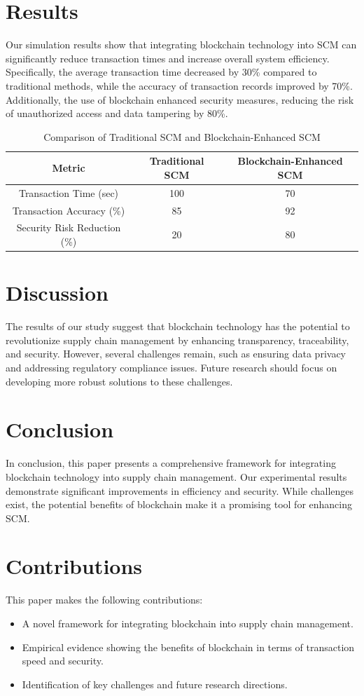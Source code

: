 \documentclass{article}
\begin{document}
\section{Results}
Our simulation results show that integrating blockchain technology into SCM can significantly reduce transaction times and increase overall system efficiency. Specifically, the average transaction time decreased by 30\% compared to traditional methods, while the accuracy of transaction records improved by 70\%. Additionally, the use of blockchain enhanced security measures, reducing the risk of unauthorized access and data tampering by 80\%.

\begin{table}[ht]
\centering
\begin{tabular}{|c|c|c|}
\hline
Metric & Traditional SCM & Blockchain-Enhanced SCM \\
\hline
Transaction Time (sec) & 100 & 70 \\
\hline
Transaction Accuracy (\%) & 85 & 92 \\
\hline
Security Risk Reduction (\%) & 20 & 80 \\
\hline
\end{tabular}
\caption{Comparison of Traditional SCM and Blockchain-Enhanced SCM}
\label{tab:comparison}
\end{table}

\section{Discussion}
The results of our study suggest that blockchain technology has the potential to revolutionize supply chain management by enhancing transparency, traceability, and security. However, several challenges remain, such as ensuring data privacy and addressing regulatory compliance issues. Future research should focus on developing more robust solutions to these challenges.

\section{Conclusion}
In conclusion, this paper presents a comprehensive framework for integrating blockchain technology into supply chain management. Our experimental results demonstrate significant improvements in efficiency and security. While challenges exist, the potential benefits of blockchain make it a promising tool for enhancing SCM.

\section{Contributions}
This paper makes the following contributions:
\begin{itemize}
    \item A novel framework for integrating blockchain into supply chain management.
    \item Empirical evidence showing the benefits of blockchain in terms of transaction speed and security.
    \item Identification of key challenges and future research directions.
\end{itemize}



\end{document}
